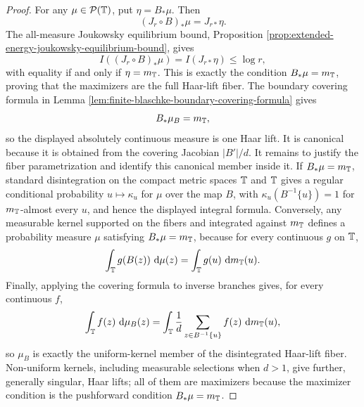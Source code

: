 \begin{proof}
For any \(\mu\in\mathcal P(\mathbb{T})\), put \(\eta=B_\ast\mu\).  Then
\[
(J_r\circ B)_\ast\mu=J_{r\ast}\eta.
\]
The all-measure Joukowsky equilibrium bound, Proposition
\ref{prop:extended-energy-joukowsky-equilibrium-bound}, gives
\[
I((J_r\circ B)_\ast\mu)=I(J_{r\ast}\eta)\le \log r,
\]
with equality if and only if \(\eta=m_{\mathbb{T}}\).  This is exactly the
condition \(B_\ast\mu=m_{\mathbb{T}}\), proving that the maximizers are the full
Haar-lift fiber.
The boundary covering formula in Lemma
\ref{lem:finite-blaschke-boundary-covering-formula} gives
\[
B_\ast\mu_B=m_{\mathbb{T}},
\]
so the displayed absolutely continuous measure is one Haar lift.  It is
canonical because it is obtained from the covering Jacobian \(|B'|/d\).
It remains to justify the fiber parametrization and identify this canonical
member inside it.  If
\(B_\ast\mu=m_{\mathbb{T}}\), standard disintegration on the compact metric spaces
\(\mathbb{T}\) and \(\mathbb{T}\) gives a regular conditional probability
\(u\mapsto\kappa_u\) for \(\mu\) over the map \(B\), with
\(\kappa_u(B^{-1}\{u\})=1\) for \(m_{\mathbb{T}}\)-almost every \(u\), and hence the
displayed integral formula.  Conversely, any measurable kernel supported on
the fibers and integrated against \(m_{\mathbb{T}}\) defines a probability measure
\(\mu\) satisfying \(B_\ast\mu=m_{\mathbb{T}}\), because for every continuous
\(g\) on \(\mathbb{T}\),
\[
\int_{\mathbb{T}}g(B(z))\,\,\mathrm{d}\mu(z)
=\int_{\mathbb{T}}g(u)\,\,\mathrm{d} m_{\mathbb{T}}(u).
\]
Finally, applying the covering formula to inverse branches gives, for every
continuous \(f\),
\[
\int_{\mathbb{T}}f(z)\,\,\mathrm{d}\mu_B(z)
=\int_{\mathbb{T}}\frac1d\sum_{z\in B^{-1}\{u\}}f(z)\,\,\mathrm{d} m_{\mathbb{T}}(u),
\]
so \(\mu_B\) is exactly the uniform-kernel member of the disintegrated
Haar-lift fiber.  Non-uniform kernels, including measurable selections when
\(d>1\), give further, generally singular, Haar lifts; all of them are
maximizers because the maximizer condition is the pushforward condition
\(B_\ast\mu=m_{\mathbb{T}}\).
\end{proof}

